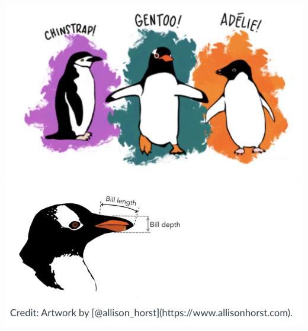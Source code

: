 \documentclass[a4paper,11pt]{article}
\theoremstyle{definition}
\begin{document}
\begin{enumerate}[resume]
\begin{center}
\includegraphics[scale=0.5, align=c]{practica3-img-penguins_species.png}
\includegraphics[scale=0.3, align=c]{practica3-img-penguins_bill.png}
\end{center}


\end{enumerate}
\end{document}

